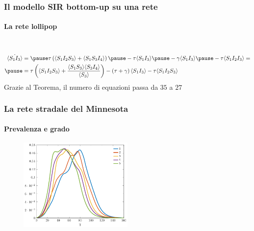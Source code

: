 \documentclass{beamer}
\newcommand{\angol}[1]{\langle #1 \rangle}
\newcommand{\tonde}[1]{\left( #1 \right)}
\theoremstyle{definition}
\theoremstyle{plain}
\begin{document}
\begin{frame}
\frametitle{Il modello SIR bottom-up su una rete}
\framesubtitle{La rete lollipop}
\begin{columns}
\begin{column}{0.5\textwidth}
   \begin{figure}[!ht]
\centering
{}
\end{figure}
\end{column}
\pause
\begin{column}{0.5\textwidth}  %
\begin{figure}[!htb]
\centering
{}
\end{figure}
\end{column}
\end{columns}
\pause
\begin{equation*}
 \begin{aligned}	
 \dot{\angol{S_1I_3}}&=
 \pause  \tau\tonde{ \angol{S_1I_2S_3} 
+ \angol{S_1S_3I_4}} \pause -  \tau  \angol{S_1I_3} \pause - \gamma\angol{S_1 I_3}\pause -\tau \angol{ S_1 I_2 I_3}= \\ \pause
 &= \tau \tonde{ \angol{S_1I_2S_3} + \frac{ \angol{S_1S_3}\angol{S_3 I_4}}{\angol{S_3}}} -\tonde{ \tau + \gamma} \angol{S_1I_3} - \tau \angol{S_1I_2S_3}
 \end{aligned}
 \end{equation*}
\pause
Grazie al Teorema,  il numero di equazioni passa da $35$ a $27$
\end{frame}
\begin{frame}
\frametitle{La rete stradale del Minnesota}
\framesubtitle{Prevalenza e grado }

   \begin{figure}[!ht]
\centering
\includegraphics[width=0.5\textwidth]{Figure/minnesota_prevalenza}
\end{figure}
\end{frame}
\end{document}
